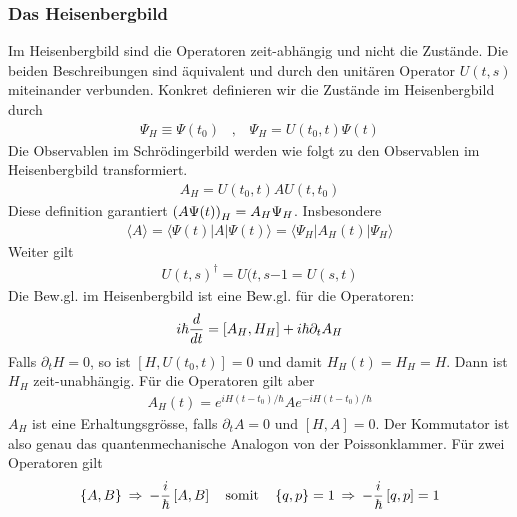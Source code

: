 \subsubsection{Das Heisenbergbild}

Im Heisenbergbild sind die Operatoren zeit-abhängig und nicht die Zustände. Die
beiden Beschreibungen sind äquivalent und durch den unitären Operator $U(t,s)$
miteinander verbunden. Konkret definieren wir die Zustände im Heisenbergbild durch
\begin{align*}
    \Psi_H \equiv \Psi(t_0)
    \hspace{10pt} , \hspace{10pt}
    \Psi_H = U(t_0,t) \Psi(t)
\end{align*}
Die Observablen im Schrödingerbild werden wie folgt zu den Observablen im
Heisenbergbild transformiert.
\begin{align*}
    A_H = U(t_0,t) A U(t,t_0)
\end{align*}
Diese definition garantiert $\left( A \Psi(t) \right)_H = A_H \Psi_H$. Insbesondere
\begin{align*}
    \langle A \rangle = \langle \Psi(t) | A | \Psi(t) \rangle
    = \langle \Psi_H | A_H (t) | \Psi_H \rangle
\end{align*}
Weiter gilt
\begin{align*}
    U(t,s)^\dagger = U(t,s{-1} = U(s,t)
\end{align*}
Die Bew.gl. im Heisenbergbild ist eine Bew.gl. für die Operatoren:
\begin{align*}
    i \hbar \frac{d}{dt} = \left[ A_H,H_H \right] + i \hbar \partial_t A_H
\end{align*}
Falls $\partial_t H = 0$, so ist $[H,U(t_0,t)] = 0$ und damit
$H_H(t) = H_H = H$. Dann ist $H_H$ zeit-unabhängig. Für die Operatoren gilt aber
\begin{align*}
    A_H (t) = e^{i H (t-t_0) / \hbar} A e^{-i H (t-t_0) / \hbar}
\end{align*}
$A_H$ ist eine Erhaltungsgrösse, falls $\partial_t A = 0$ und $[H,A] = 0$.
Der Kommutator ist also genau das quantenmechanische Analogon von der
Poissonklammer. Für zwei Operatoren gilt
\begin{align*}
    \left\{ A,B \right\}
    \hspace{2pt} \Rightarrow \hspace{2pt}
    - \frac{i}{\hbar} \left[ A,B \right]
    \hspace{10pt} \text{somit} \hspace{10pt}
    \left\{ q,p \right\} = 1
    \hspace{2pt} \Rightarrow \hspace{2pt}
    - \frac{i}{\hbar} \left[ q,p \right] = 1
\end{align*}

